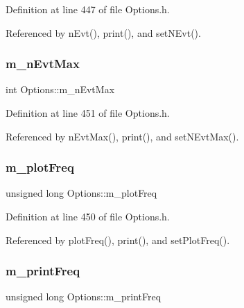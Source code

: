 Definition at line 447 of file Options.\+h.



Referenced by n\+Evt(), print(), and set\+N\+Evt().

\mbox{\label{classOptions_a825a47258257937a8caa902f5fff7e8a}} 
\subsubsection{\texorpdfstring{m\+\_\+n\+Evt\+Max}{m\_nEvtMax}}
{\footnotesize\ttfamily int Options\+::m\+\_\+n\+Evt\+Max\hspace{0.3cm}{\ttfamily [private]}}



Definition at line 451 of file Options.\+h.



Referenced by n\+Evt\+Max(), print(), and set\+N\+Evt\+Max().

\mbox{\label{classOptions_aa7f7161bc67732b310937afb137657a0}} 
\subsubsection{\texorpdfstring{m\+\_\+plot\+Freq}{m\_plotFreq}}
{\footnotesize\ttfamily unsigned long Options\+::m\+\_\+plot\+Freq\hspace{0.3cm}{\ttfamily [private]}}



Definition at line 450 of file Options.\+h.



Referenced by plot\+Freq(), print(), and set\+Plot\+Freq().

\mbox{\label{classOptions_acf8f96cbc3245ec4b3b47bd3bfa0d742}} 
\subsubsection{\texorpdfstring{m\+\_\+print\+Freq}{m\_printFreq}}
{\footnotesize\ttfamily unsigned long Options\+::m\+\_\+print\+Freq\hspace{0.3cm}{\ttfamily [private]}}



